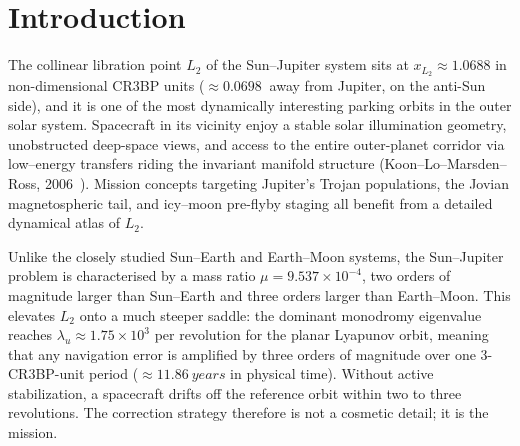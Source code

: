 \documentclass[11pt,a4paper]{article}
\begin{document}
\tableofcontents

\vspace{0.3cm}

\section{Introduction}

The collinear libration point $L_2$ of the Sun--Jupiter system sits at $x_{L_2} \approx 1.0688$ in non-dimensional CR3BP units ($\approx\SI{0.0698}{}$ away from Jupiter, on the anti-Sun side), and it is one of the most dynamically interesting parking orbits in the outer solar system. Spacecraft in its vicinity enjoy a stable solar illumination geometry, unobstructed deep-space views, and access to the entire outer-planet corridor via low--energy transfers riding the invariant manifold structure (Koon--Lo--Marsden--Ross, 2006~\cite{koon2006}). Mission concepts targeting Jupiter's Trojan populations, the Jovian magnetospheric tail, and icy--moon pre-flyby staging all benefit from a detailed dynamical atlas of $L_2$.

Unlike the closely studied Sun--Earth and Earth--Moon systems, the Sun--Jupiter problem is characterised by a mass ratio $\mu = 9.537\times 10^{-4}$, two orders of magnitude larger than Sun--Earth and three orders larger than Earth--Moon. This elevates $L_2$ onto a much steeper saddle: the dominant monodromy eigenvalue reaches $\lambda_u \approx 1.75\times 10^3$ per revolution for the planar Lyapunov orbit, meaning that any navigation error is amplified by three orders of magnitude over one 3-CR3BP-unit period ($\approx\SI{11.86}{years}$ in physical time). Without active stabilization, a spacecraft drifts off the reference orbit within two to three revolutions. The correction strategy therefore is not a cosmetic detail; it is the mission.
\end{document}
